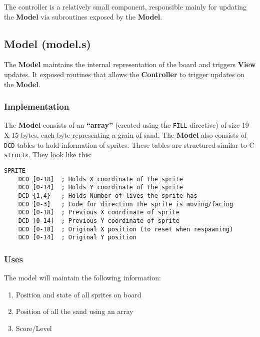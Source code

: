 \documentclass[]{article}
\begin{document}
The controller is a relatively small component, responsible mainly for
updating the \textbf{Model} via subroutines exposed by the
\textbf{Model}.

\subsection{Model (model.s)}\label{model-model.s}

The \textbf{Model} maintains the internal representation of the board
and triggers \textbf{View} updates. It exposed routines that allows the
\textbf{Controller} to trigger updates on the \textbf{Model}.

\subsubsection{Implementation}\label{implementation}

The \textbf{Model} consists of an \textbf{``array''} (created using the
\texttt{FILL} directive) of size 19 X 15 bytes, each byte representing a
grain of sand. The \textbf{Model} also consists of \texttt{DCD} tables
to hold information of sprites. These tables are structured similar to C
\texttt{struct}s. They look like this:

\begin{verbatim}
SPRITE
    DCD [0-18]  ; Holds X coordinate of the sprite
    DCD [0-14]  ; Holds Y coordinate of the sprite
    DCD {1,4}   ; Holds Number of lives the sprite has
    DCD [0-3]   ; Code for direction the sprite is moving/facing
    DCD [0-18]  ; Previous X coordinate of sprite
    DCD [0-14]  ; Previous Y coordinate of sprite
    DCD [0-18]  ; Original X position (to reset when respawning)
    DCD [0-14]  ; Original Y position
\end{verbatim}

\subsubsection{Uses}\label{uses}

The model will maintain the following information:

\begin{enumerate}
\def\labelenumi{\arabic{enumi}.}
\itemsep1pt\parskip0pt
\item
  Position and state of all sprites on board
\item
  Position of all the sand using an array
\item
  Score/Level
\end{enumerate}
\end{document}
